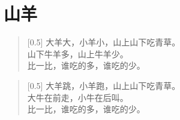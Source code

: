 \documentclass[12pt,UTF-8,openany]{ctexbook}
\begin{document}
\clearpage

\begin{center}
    
\end{center}


\hanzibox{}\hanzibox{}\hanzibox{}\hanzibox{}\hspace{1em}\hanzibox{}\hanzibox{}\hanzibox{}\hanzibox{}

\hanzibox{}\hanzibox{}\hanzibox{}\hanzibox{}\hspace{1em}\hanzibox{}\hanzibox{}\hanzibox{}\hanzibox{}

\hanzibox{}\hanzibox{}\hanzibox{}\hanzibox{}\hspace{1em}\hanzibox{}\hanzibox{}\hanzibox{}\hanzibox{}

\hanzibox{}\hanzibox{}\hanzibox{}\hanzibox{}\hspace{1em}




\chapter{山羊}

\begin{large}
    
    \begin{verse}[0.5\linewidth]
        大羊大，小羊小，山上山下吃青草。 \\
        山下牛羊多，山上牛羊少。 \\
        比一比，谁吃的多，谁吃的少。
    \end{verse}
    
    
    \begin{verse}[0.5\linewidth]
        大羊跳，小羊跑，山上山下吃青草。 \\
        大牛在前走，小牛在后叫。 \\
        比一比，谁吃的多，谁吃的少。
    \end{verse}
    
\end{large}


\clearpage

\begin{center}
    
    
\end{center}
\end{document}
